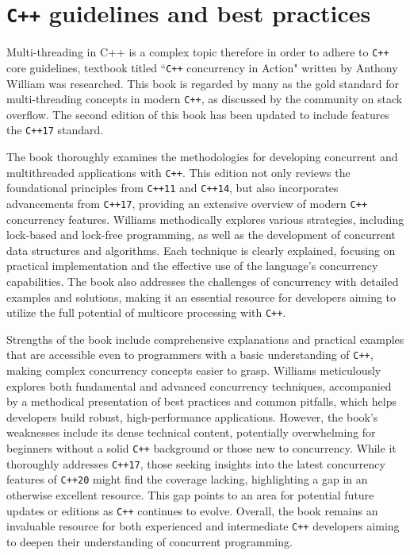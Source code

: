 \section{\texttt{C++} guidelines and best practices}

Multi-threading in C++ is a complex topic therefore in order to adhere to \texttt{C++} core guidelines,  textbook titled ``\texttt{C++} concurrency in Action" written by Anthony William was researched\cite{c++_concurrency_in_action}. This book is regarded by many as the gold standard for multi-threading concepts in modern \texttt{C++}, as discussed by the community on stack overflow\cite{c++_books_stackoverflow}. The second edition of this book has been updated to include features the \texttt{C++17} standard.

The book\cite{c++_concurrency_in_action} thoroughly examines the methodologies for developing concurrent and multithreaded applications with \texttt{C++}. This edition not only reviews the foundational principles from \texttt{C++11} and \texttt{C++14}, but also incorporates advancements from \texttt{C++17}, providing an extensive overview of modern \texttt{C++} concurrency features. Williams methodically explores various strategies, including lock-based and lock-free programming, as well as the development of concurrent data structures and algorithms. Each technique is clearly explained, focusing on practical implementation and the effective use of the language's concurrency capabilities. The book also addresses the challenges of concurrency with detailed examples and solutions, making it an essential resource for developers aiming to utilize the full potential of multicore processing with \texttt{C++}.

Strengths of the book\cite{c++_books_stackoverflow} include comprehensive explanations and practical examples that are accessible even to programmers with a basic understanding of \texttt{C++}, making complex concurrency concepts easier to grasp. Williams meticulously explores both fundamental and advanced concurrency techniques, accompanied by a methodical presentation of best practices and common pitfalls, which helps developers build robust, high-performance applications. However, the book's weaknesses include its dense technical content, potentially overwhelming for beginners without a solid \texttt{C++} background or those new to concurrency. While it thoroughly addresses \texttt{C++17}, those seeking insights into the latest concurrency features of \texttt{C++20} might find the coverage lacking, highlighting a gap in an otherwise excellent resource. This gap points to an area for potential future updates or editions as \texttt{C++} continues to evolve. Overall, the book remains an invaluable resource for both experienced and intermediate \texttt{C++} developers aiming to deepen their understanding of concurrent programming.

